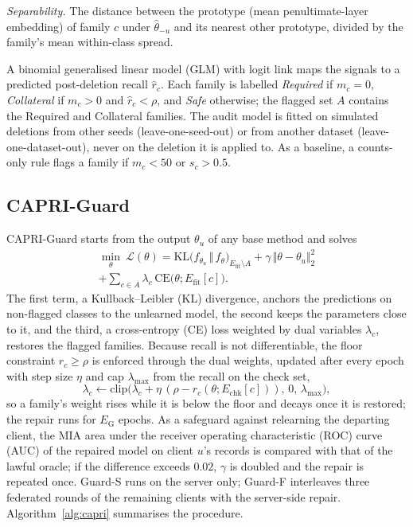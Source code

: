 \documentclass[pdflatex,sn-mathphys-num,iicol]{sn-jnl}
\newcommand{\Efit}{E_{\mathrm{fit}}}
\newcommand{\Echk}{E_{\mathrm{chk}}}
\begin{document}
\emph{Separability.} The distance between the prototype (mean penultimate-layer embedding) of family $c$ under $\hat\theta_{-u}$ and its nearest other prototype, divided by the family's mean within-class spread.

A binomial generalised linear model (GLM) with logit link maps the signals to a predicted post-deletion recall $\hat r_c$. Each family is labelled \emph{Required} if $m_c=0$, \emph{Collateral} if $m_c>0$ and $\hat r_c<\rho$, and \emph{Safe} otherwise; the flagged set $A$ contains the Required and Collateral families. The audit model is fitted on simulated deletions from other seeds (leave-one-seed-out) or from another dataset (leave-one-dataset-out), never on the deletion it is applied to. As a baseline, a counts-only rule flags a family if $m_c<50$ or $s_c>0.5$.

\subsection{CAPRI-Guard}\label{sec:guard}

CAPRI-Guard starts from the output $\theta_u$ of any base method and solves
\begin{multline}\label{eq:guard}
\min_{\theta}\ \mathcal{L}(\theta)=\mathrm{KL}\bigl(f_{\theta_u}\,\Vert\,f_{\theta}\bigr)_{\Efit\setminus A}+\gamma\,\Vert\theta-\theta_u\Vert_2^2\\
+\sum_{c\in A}\lambda_c\,\mathrm{CE}\bigl(\theta;\Efit[c]\bigr).
\end{multline}
The first term, a Kullback--Leibler (KL) divergence, anchors the predictions on non-flagged classes to the unlearned model, the second keeps the parameters close to it, and the third, a cross-entropy (CE) loss weighted by dual variables $\lambda_c$, restores the flagged families. Because recall is not differentiable, the floor constraint $r_c\ge\rho$ is enforced through the dual weights, updated after every epoch with step size $\eta$ and cap $\lambda_{\max}$ from the recall on the check set,
\begin{equation}\label{eq:dual}
\lambda_c\leftarrow\mathrm{clip}\bigl(\lambda_c+\eta\,(\rho-r_c(\theta;\Echk[c])),\,0,\,\lambda_{\max}\bigr),
\end{equation}
so a family's weight rises while it is below the floor and decays once it is restored; the repair runs for $E_{\mathrm{G}}$ epochs. As a safeguard against relearning the departing client, the MIA area under the receiver operating characteristic (ROC) curve (AUC) of the repaired model on client $u$'s records is compared with that of the lawful oracle; if the difference exceeds $0.02$, $\gamma$ is doubled and the repair is repeated once. Guard-S runs on the server only; Guard-F interleaves three federated rounds of the remaining clients with the server-side repair. Algorithm~\ref{alg:capri} summarises the procedure.
\end{document}
